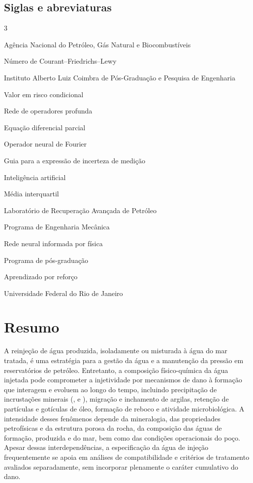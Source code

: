 \documentclass[10pt,a4paper]{article}
\newcommand{\itemedital}[1]{}
\begin{document}
{\subsection*{Siglas e abreviaturas}
\begin{multicols}{3}
\raggedright
\begin{description}[leftmargin=4.4em,labelwidth=4.2em,labelsep=0.2em,itemsep=0pt,font=\normalfont\bfseries]
\item[ANP] Agência Nacional do Petróleo, Gás Natural e Biocombustíveis
\item[CFL] Número de Courant--Friedrichs--Lewy
\item[COPPE] Instituto Alberto Luiz Coimbra de Pós-Graduação e Pesquisa de Engenharia
\item[CVaR] Valor em risco condicional
\item[DeepONet] Rede de operadores profunda
\item[EDP] Equação diferencial parcial
\item[FNO] Operador neural de Fourier
\item[GUM] Guia para a expressão de incerteza de medição
\item[IA] Inteligência artificial
\item[IQM] Média interquartil
\item[LRAP+] Laboratório de Recuperação Avançada de Petróleo
\item[PEM] Programa de Engenharia Mecânica
\item[PINN] Rede neural informada por física
\item[PPG] Programa de pós-graduação
\item[RL] Aprendizado por reforço
\item[UFRJ] Universidade Federal do Rio de Janeiro
\end{description}
\end{multicols}
}
\fi
\clearpage
{}

\section*{Resumo}\itemedital{2.16 II; Anexo 1 B}

A reinjeção de água produzida, isoladamente ou misturada à água do mar tratada, é uma estratégia para a gestão da água e a manutenção da pressão em reservatórios de petróleo. Entretanto, a composição físico-química da água injetada pode comprometer a injetividade por mecanismos de dano à formação que interagem e evoluem ao longo do tempo, incluindo precipitação de incrustações minerais (,  e ), migração e inchamento de argilas, retenção de partículas e gotículas de óleo, formação de reboco e atividade microbiológica. A intensidade desses fenômenos depende da mineralogia, das propriedades petrofísicas e da estrutura porosa da rocha, da composição das águas de formação, produzida e do mar, bem como das condições operacionais do poço. Apesar dessas interdependências, a especificação da água de injeção frequentemente se apoia em análises de compatibilidade e critérios de tratamento avaliados separadamente, sem incorporar plenamente o caráter cumulativo do dano.
\end{document}

